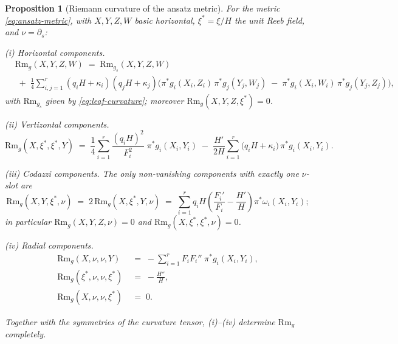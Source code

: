 \documentclass[11pt]{amsart}
\theoremstyle{plain}
\numberwithin{equation}{section}
\newtheorem{proposition}[theorem]{Proposition}
\theoremstyle{definition}
\theoremstyle{remark}
\begin{document}
\begin{proposition}[Riemann curvature of the ansatz metric]\label{prop:riemann-ansatz}
	For the metric \eqref{eq:ansatz-metric}, with $X, Y, Z, W$ basic horizontal, $\xi^* = \xi/H$ the unit Reeb field, and $\nu = \partial_s$:
	
	\emph{(i) Horizontal components.}
	\begin{equation}\label{eq:Rm-horizontal}
		\begin{aligned}
			&\mathrm{Rm}_g(X, Y, Z, W) \;=\; \mathrm{Rm}_{g_s}(X, Y, Z, W) \\
			& \;+\; \frac{1}{4} \sum_{i,j=1}^r (q_i H + \kappa_i)(q_j H + \kappa_j) \Big( \pi^*g_i(X_i, Z_i)\, \pi^*g_j(Y_j, W_j) \;-\; \pi^*g_i(X_i, W_i)\, \pi^*g_j(Y_j, Z_j) \Big),
		\end{aligned}
	\end{equation}
	with $\mathrm{Rm}_{g_s}$ given by \eqref{eq:leaf-curvature}; moreover $\mathrm{Rm}_g(X, Y, Z, \xi^*) = 0$.
	
	\emph{(ii) Vertizontal components.}
	\begin{equation}\label{eq:Rm-vertizontal}
		\mathrm{Rm}_g(X, \xi^*, \xi^*, Y) \;=\; \frac{1}{4} \sum_{i=1}^r \frac{(q_i H)^2}{F_i^2}\; \pi^*g_i(X_i, Y_i) \;-\; \frac{H'}{2H} \sum_{i=1}^r \big( q_i H + \kappa_i \big)\, \pi^*g_i(X_i, Y_i) .
	\end{equation}
	
	\emph{(iii) Codazzi components.} The only non-vanishing components with exactly one $\nu$-slot are
		\begin{equation}\label{eq:Rm-codazzi}
		\mathrm{Rm}_g(X, Y, \xi^*, \nu) \;=\; 2\, \mathrm{Rm}_g(X, \xi^*, Y, \nu) \;=\; \sum_{i=1}^r q_i H \left( \frac{F_i'}{F_i} - \frac{H'}{H} \right) \pi^*\omega_i(X_i, Y_i) ;
	\end{equation}
	in particular $\mathrm{Rm}_g(X, Y, Z, \nu) = 0$ and $\mathrm{Rm}_g(X, \xi^*, \xi^*, \nu) = 0$.
	
	\emph{(iv) Radial components.}
	\begin{align}
			\mathrm{Rm}_g(X, \nu, \nu, Y) &\;=\; -\sum_{i=1}^r F_i F_i''\; \pi^*g_i(X_i, Y_i), \nonumber \\
			\label{eq:Rm-radial}
			\mathrm{Rm}_g(\xi^*, \nu, \nu, \xi^*) &\;=\; -\frac{H''}{H}, \\
			\mathrm{Rm}_g(X, \nu, \nu, \xi^*) &\;=\; 0 .\nonumber
	\end{align}
	
	Together with the symmetries of the curvature tensor, (i)--(iv) determine $\mathrm{Rm}_g$ completely.
	
\end{proposition}
\end{document}
